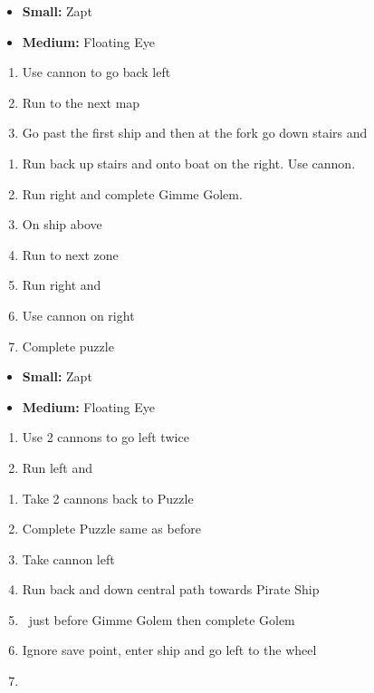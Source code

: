 \begin{puzzle}
	\begin{itemize}
		\item \textbf{Small:} Zapt
		\item \textbf{Medium:} Floating Eye
	\end{itemize}
\end{puzzle}
\begin{enumerate}[resume]
	\item Use cannon to go back left
	\item Run to the next map
	\item Go past the first ship and then at the fork go down stairs and 
\end{enumerate}
\begin{enumerate}[resume]
	\item Run back up stairs and onto boat on the right. Use cannon.
	\item Run right and complete Gimme Golem.
	\item On ship above 
	\item Run to next zone
	\item Run right and \cs\
	\item Use cannon on right
	\item Complete puzzle
\end{enumerate}
\begin{puzzle}
	\begin{itemize}
		\item \textbf{Small:} Zapt
		\item \textbf{Medium:} Floating Eye
	\end{itemize}
\end{puzzle}
\begin{enumerate}[resume]
	\item Use 2 cannons to go left twice
	\item Run left and 
\end{enumerate}
\begin{enumerate}[resume]
	\item Take 2 cannons back to Puzzle
	\item Complete Puzzle same as before
	\item Take cannon left
	\item Run back and down central path towards Pirate Ship
	\item \cs\ just before Gimme Golem then complete Golem
	\item Ignore save point, enter ship and go left to the wheel
	\item \cs\
\end{enumerate}
